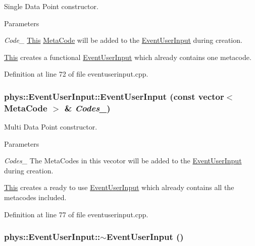 Single Data Point constructor. 


\begin{DoxyParams}{Parameters}
\item[{\em Code\_\-}]\hyperlink{structThis}{This} \hyperlink{classphys_1_1MetaCode}{MetaCode} will be added to the \hyperlink{classphys_1_1EventUserInput}{EventUserInput} during creation.\end{DoxyParams}
\hyperlink{structThis}{This} creates a functional \hyperlink{classphys_1_1EventUserInput}{EventUserInput} which already contains one metacode. 

Definition at line 72 of file eventuserinput.cpp.

\hypertarget{classphys_1_1EventUserInput_a56ca671dd5d28396cab0d7036e08a1f1}{
\subsubsection[{EventUserInput}]{\setlength{\rightskip}{0pt plus 5cm}phys::EventUserInput::EventUserInput (const vector$<$ {\bf MetaCode} $>$ \& {\em Codes\_\-})}}
\label{d7/df5/classphys_1_1EventUserInput_a56ca671dd5d28396cab0d7036e08a1f1}


Multi Data Point constructor. 


\begin{DoxyParams}{Parameters}
\item[{\em Codes\_\-}]The MetaCodes in this vecotor will be added to the \hyperlink{classphys_1_1EventUserInput}{EventUserInput} during creation.\end{DoxyParams}
\hyperlink{structThis}{This} creates a ready to use \hyperlink{classphys_1_1EventUserInput}{EventUserInput} which already contains all the metacodes included. 

Definition at line 77 of file eventuserinput.cpp.

\hypertarget{classphys_1_1EventUserInput_a5c4bb6a5016dad4cb32f51cc1d88eac3}{
\subsubsection[{$\sim$EventUserInput}]{\setlength{\rightskip}{0pt plus 5cm}phys::EventUserInput::$\sim$EventUserInput ()}}
\label{d7/df5/classphys_1_1EventUserInput_a5c4bb6a5016dad4cb32f51cc1d88eac3}


